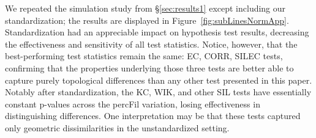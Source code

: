 \documentclass[12pt]{article}
\newcommand{\figref}[1]{Figure~\ref{#1}}
\begin{document}
We repeated the simulation study from \S \ref{sec:results1} except including our standardization; the results are displayed in \figref{fig:subLinesNormApp}. Standardization had an appreciable impact on hypothesis test results, decreasing the effectiveness and sensitivity of all test statistics. Notice, however, that the best-performing test statistics remain the same: EC, CORR, SILEC tests, confirming that the properties underlying those three tests are better able to capture purely topological differences than any other test presented in this paper. Notably after standardization, the KC, WIK, and other SIL tests have essentially constant p-values across the percFil variation, losing effectiveness in distinguishing differences. One interpretation may be that these tests captured only geometric dissimilarities in the unstandardized setting.



\end{document}
